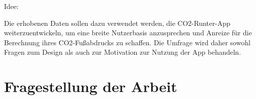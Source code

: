 Idee:

Die erhobenen Daten sollen dazu verwendet werden, die CO2-Runter-App weiterzuentwickeln, um eine breite Nutzerbasis anzusprechen und Anreize für die Berechnung ihres CO2-Fußabdrucks zu schaffen. Die Umfrage wird daher sowohl Fragen zum Design als auch zur Motivation zur Nutzung der App behandeln.



\section{Fragestellung der Arbeit}

